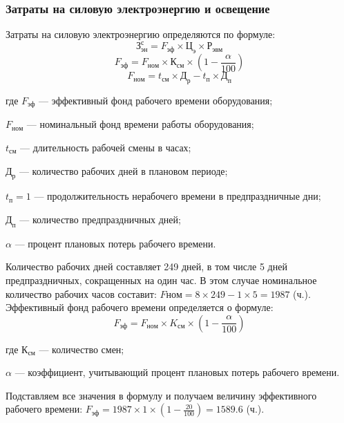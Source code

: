 \subsubsection{Затраты на силовую электроэнергию и освещение}
Затраты на силовую электроэнергию определяются по формуле:
\begin{equation}З_{эн}^{с} = F_{эф} \times{} Ц_{э} \times{} Р_{эвм}\end{equation}
\begin{equation}F_{эф} = F_{ном} \times{} К_{см} \times{} (1 - \frac{\alpha}{100})\end{equation}
\begin{equation}F_{ном} = t_{см} \times{} Д_{р} - t_{п} \times{} Д_{п}\end{equation}

\begin{ESKDexplanation}
	\item[где ]{} $F_{эф}$ --- эффективный фонд рабочего времени оборудования;
	\item{} $F_{ном}$ --- номинальный  фонд времени работы оборудования;
	\item{} $t_{см}$ --- длительность рабочей смены в часах;
	\item{} $Д_{р}$ --- количество рабочих дней в плановом периоде;
	\item{} $t_{п} = 1$ --- продолжительность нерабочего времени в предпраздничные дни;
	\item{} $Д_{п}$ --- количество предпраздничных дней;
	\item{} $\alpha$ --- процент плановых потерь рабочего времени.
\end{ESKDexplanation}
Количество рабочих дней составляет 249 дней, в том числе 5 дней предпраздничных, сокращенных на один час.
В этом случае номинальное количество рабочих часов составит: $Fном =  8 \times{} 249 - 1 \times{} 5 = 1987$ (ч.).
Эффективный фонд  рабочего времени определяется о формуле:
\begin{equation}
	F_{эф} = F_{ном} \times{} K_{см} \times{} (1 - \frac{\alpha}{100})
\end{equation}
\begin{ESKDexplanation}
	\item[где ]{} $К_{см}$ --- количество смен;
	\item{} $\alpha$ --- коэффициент, учитывающий процент плановых потерь рабочего времени.
\end{ESKDexplanation}
Подставляем  все значения в формулу и получаем величину эффективного рабочего времени:
$F_{эф} = 1987 \times{} 1 \times{} (1 - \frac{20}{100}) = 1589.6$ (ч.).

